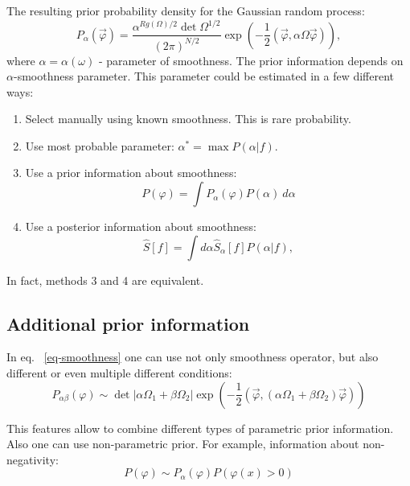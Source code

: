 \documentclass{webofc}
\begin{document}
The resulting prior probability density for the Gaussian random process:
\begin{equation}
	P_{\alpha}(\vec{\varphi})  = \frac{\alpha^{Rg(\Omega)/2}\det\Omega^{1/2}}{(2\pi)^{N/2}} 
    \exp\left(-\frac{1}{2}(\vec{\varphi},\alpha\Omega\vec{\varphi})\right),
\end{equation}
where  $\alpha = \alpha(\omega)$ - parameter of smoothness.
The prior information depends on $\alpha$-smoothness parameter. This parameter could be estimated in a few different ways:
\begin{enumerate}
\item Select manually using known smoothness. This is rare probability.
\item Use most probable parameter: $\alpha^* = \max P(\alpha|f).$
\item Use a prior information about smoothness: 
  \begin{equation}\label{eq:varAposteriorAlpha}
      P(\varphi)  = \int P_{\alpha}(\varphi) P(\alpha)~d\alpha
  \end{equation}
\item Use a posterior information about smoothness: 
  \begin{equation}\label{eq:solveAposteriorAlpha}
      \hat{S}[f] = \int d\alpha \hat{S}_{\alpha}[f] P(\alpha|f),
  \end{equation} 
\end{enumerate}

In fact, methods 3 and 4 are equivalent.

\subsection{Additional prior information}

In eq. ~\ref{eq-smoothness} one can use not only smoothness operator, but also different or even multiple different conditions: 
\begin{equation*}
    P_{\alpha\beta}(\varphi) \sim  \det \left|\alpha\Omega_1 +\beta\Omega_2\right|\exp\left(-\frac{1}{2} (\vec{\varphi},(\alpha\Omega_1 + \beta\Omega_2)\vec{\varphi})\right)
\end{equation*}

This features allow to combine different types of parametric prior information. Also one can use non-parametric prior. For example, information about non-negativity:
\begin{equation*}
    P(\varphi) \sim P_{\alpha}(\varphi)P(\varphi(x) > 0)
\end{equation*}
\end{document}
